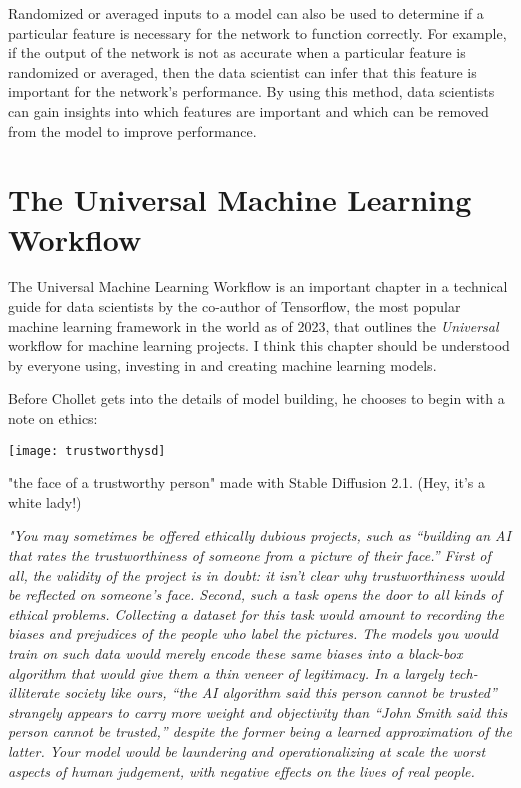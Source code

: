 Randomized or averaged inputs to a model can also be used to determine if a particular feature is necessary for the network to function correctly. For example, if the output of the network is not as accurate when a particular feature is randomized or averaged, then the data scientist can infer that this feature is important for the network’s performance. By using this method, data scientists can gain insights into which features are important and which can be removed from the model to improve performance.

\section{The Universal Machine Learning Workflow}

The Universal Machine Learning Workflow is an important chapter in a technical guide for data scientists by the co-author of Tensorflow, the most popular machine learning framework in the world as of 2023, that outlines the \textit{Universal} workflow for machine learning projects. I think this chapter should be understood by everyone using, investing in and creating machine learning models. 

Before Chollet gets into the details of model building, he chooses to begin with a note on ethics: 

\begin{marginfigure}[-5.5cm]
        \texttt{[image: trustworthysd]}
        \caption{"the face of a trustworthy person" made with Stable Diffusion 2.1. (Hey, it's a white lady!)}
\end{marginfigure}

\textit{"You may sometimes be offered ethically dubious projects, such as “building an AI that rates the trustworthiness of someone from a picture of their face.” First of all, the validity of the project is in doubt: it isn’t clear why trustworthiness would be reflected on someone’s face. Second, such a task opens the door to all kinds of ethical problems. Collecting a dataset for this task would amount to recording the biases and prejudices of the people who label the pictures. The models you would train on such data would merely encode these same biases into a black-box algorithm that would give them a thin veneer of legitimacy. In a largely tech-illiterate society like ours, “the AI algorithm said this person cannot be trusted” strangely appears to carry more weight and objectivity than “John Smith said this person cannot be trusted,” despite the former being a learned approximation of the latter. Your model would be laundering and operationalizing at scale the worst aspects of human judgement, with negative effects on the lives of real people.} \cite{chollet2022}



